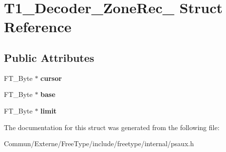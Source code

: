 \hypertarget{struct_t1___decoder___zone_rec__}{}\section{T1\+\_\+\+Decoder\+\_\+\+Zone\+Rec\+\_\+ Struct Reference}
\label{struct_t1___decoder___zone_rec__}
\subsection*{Public Attributes}
\begin{DoxyCompactItemize}
\item 
F\+T\+\_\+\+Byte $\ast$ {\bfseries cursor}\hypertarget{struct_t1___decoder___zone_rec___a14e9f190496672f6174ead91e375767d}{}\label{struct_t1___decoder___zone_rec___a14e9f190496672f6174ead91e375767d}

\item 
F\+T\+\_\+\+Byte $\ast$ {\bfseries base}\hypertarget{struct_t1___decoder___zone_rec___a9cd7e54387b238504b1e8aae47b7da7c}{}\label{struct_t1___decoder___zone_rec___a9cd7e54387b238504b1e8aae47b7da7c}

\item 
F\+T\+\_\+\+Byte $\ast$ {\bfseries limit}\hypertarget{struct_t1___decoder___zone_rec___a46fe1e4aa9bdb712ae414305f88d95db}{}\label{struct_t1___decoder___zone_rec___a46fe1e4aa9bdb712ae414305f88d95db}

\end{DoxyCompactItemize}


The documentation for this struct was generated from the following file\+:\begin{DoxyCompactItemize}
\item 
Commun/\+Externe/\+Free\+Type/include/freetype/internal/psaux.\+h\end{DoxyCompactItemize}
